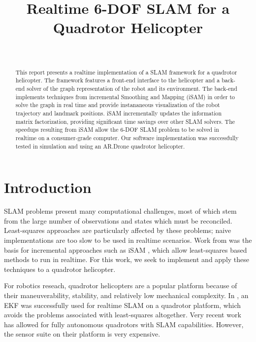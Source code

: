 \documentclass[conference]{IEEEtran}
\title{Realtime 6-DOF SLAM for a Quadrotor Helicopter}
\author{\IEEEauthorblockN{Stephen Chaves\ \ \ \ \  Schuyler Cohen\ \ \ \ \  Patrick
     O'Keefe\ \ \ \ \  Paul Ozog}\\
   \IEEEauthorblockA{University of Michigan}
}
\begin{document}
\maketitle



\begin{abstract}

  This report presents a realtime implementation of a \ac{SLAM} framework for a quadrotor
  helicopter.  The framework features a front-end interface to the helicopter and a
  back-end solver of the graph representation of the robot and its environment. The
  back-end implements techniques from incremental Smoothing and Mapping (iSAM) in order to
  solve the graph in real time and provide instananeous visualization of the robot
  trajectory and landmark positions. iSAM incrementally updates the information matrix
  factorization, providing significant time savings over other \ac{SLAM} solvers. The speedups
  resulting from iSAM allow the 6-\ac{DOF} \ac{SLAM} problem to be solved in realtime on a
  consumer-grade computer. Our software implementation was successfully tested in simulation
  and using an AR.Drone quadrotor helicopter.

\end{abstract}






\section{Introduction}
\label{sec:introduction}


\ac{SLAM} problems present many computational challenges, most of which stem from the
large number of observations and states which must be reconciled. Least-squares approaches
are particularly affected by these problems; naive implementations are too slow to be used
in realtime scenarios. Work from \cite{dellaert2005square} was the basis for incremental
approaches such as iSAM \cite{Kaess08tro}, which allow least-squares based methods to run
in realtime. For this work, we seek to implement and apply these techniques to a quadrotor
helicopter.


For robotics reseach, quadrotor helicopters are a popular platform because of their
maneuverability, stability, and relatively low mechanical complexity. In
\cite{achtelik2008autonomous}, an \ac{EKF} was successfully used for realtime \ac{SLAM} on
a quadrotor platform, which avoids the problems associated with least-squares altogether. Very
recent work \cite{ghadiok2011autonomous} has allowed for fully autonomous quadrotors with
SLAM capabilities. However, the sensor suite on their platform is very expensive.
\end{document}
